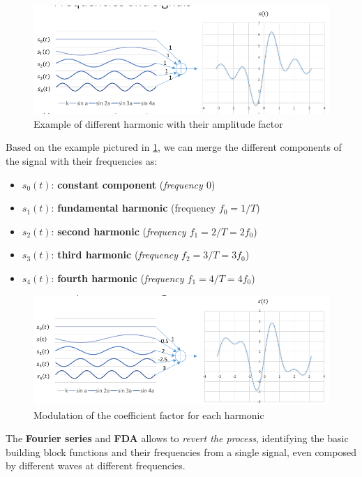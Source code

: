 \documentclass[10pt,a4paper]{report}
\theoremstyle{definition}
\begin{document}
\begin{figure}[h]
	\centering\includegraphics[scale=0.50]{images/Pasted image 20230506094845.png}
	\caption{Example of different harmonic with their amplitude factor}
	\label{harmonic-eg2}
\end{figure}
Based on the example pictured in \ref{harmonic-eg2}, we can merge the different components of the signal with their frequencies as:
\begin{itemize}
	\item 
	$s_{0}(t)$: \textbf{constant component} (\textit{frequency $0$})
	\item 
	$s_{1}(t)$: \textbf{fundamental harmonic}  (frequency $f_{0}= 1/T$)
	\item 
	$s_{2}(t)$: \textbf{second harmonic} (\textit{frequency $f_{1}= 2/T=2f_{0}$})
	\item 
	$s_{3}(t)$: \textbf{third harmonic} (\textit{frequency $f_{2}= 3/T=3f_{0}$})
	\item 
	$s_{4}(t)$: \textbf{fourth harmonic} (\textit{frequency $f_{1}= 4/T=4f_{0}$})

	
\end{itemize}
	\begin{figure}[h!]
	\centering\includegraphics[scale=0.50]{images/Pasted image 20230506095210.png}
	\caption{Modulation of the coefficient factor for each harmonic}
\end{figure}
The \textbf{Fourier series} and \textbf{FDA} allows to \textit{revert the process}, identifying the basic building block functions and their frequencies from a single signal, even composed by different waves at different frequencies.\\
\end{document}
